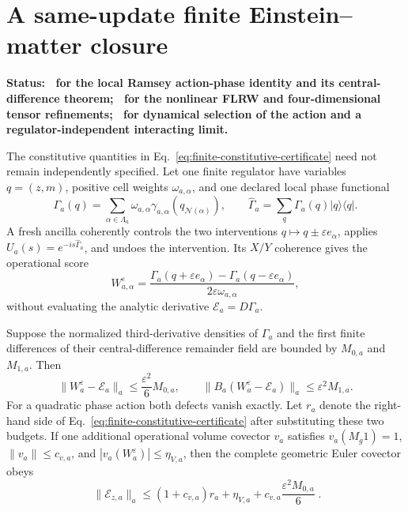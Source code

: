 \section{A same-update finite Einstein--matter closure}
\label{sec:same-update-einstein}

\textbf{Status: \StatusModel\ for the local Ramsey action-phase identity and
its central-difference theorem; \StatusNumerical\ for the nonlinear FLRW and
four-dimensional tensor refinements; \StatusOpen\ for dynamical selection of
the action and a regulator-independent interacting limit.}

The constitutive quantities in
Eq.~\eqref{eq:finite-constitutive-certificate} need not remain independently
specified.  Let one finite regulator have variables \(q=(z,m)\), positive
cell weights \(\omega_{a,\alpha}\), and one declared local phase functional
\begin{equation}
 \Gamma_a(q)=\sum_{\alpha\in\Lambda_a}
 \omega_{a,\alpha}\gamma_{a,\alpha}(q_{\mathcal N(\alpha)}),
 \qquad
 \widehat\Gamma_a=\sum_q\Gamma_a(q)|q\rangle\langle q|.
 \label{eq:same-update-local-action}
\end{equation}
A fresh ancilla coherently controls the two interventions
\(q\mapsto q\pm\varepsilon e_\alpha\), applies
\(U_a(s)=e^{-is\widehat\Gamma_a}\), and undoes the intervention.  Its
\(X/Y\) coherence gives the operational score
\begin{equation}
 W^\varepsilon_{a,\alpha}
 =\frac{\Gamma_a(q+\varepsilon e_\alpha)
              -\Gamma_a(q-\varepsilon e_\alpha)}
        {2\varepsilon\omega_{a,\alpha}} ,
 \label{eq:same-update-operational-score}
\end{equation}
without evaluating the analytic derivative
\(\mathcal E_a=D\Gamma_a\).

\begin{theorem}
\label{thm:same-update-einstein}
Suppose the normalized third-derivative densities of \(\Gamma_a\) and the
first finite differences of their central-difference remainder field are
bounded by \(M_{0,a}\) and \(M_{1,a}\).  Then
\begin{equation}
 \|W_a^\varepsilon-\mathcal E_a\|_a
 \le\frac{\varepsilon^2}{6}M_{0,a},
 \qquad
 \|B_a(W_a^\varepsilon-\mathcal E_a)\|_a
 \le\varepsilon^2M_{1,a}.
 \label{eq:same-update-two-defects}
\end{equation}
For a quadratic phase action both defects vanish exactly.  Let \(r_a\)
denote the right-hand side of
Eq.~\eqref{eq:finite-constitutive-certificate} after substituting these two
budgets.  If one additional operational volume covector \(v_a\) satisfies
\(v_a(M_g1)=1\), \(\|v_a\|\le c_{v,a}\), and
\(|v_a(W_a^\varepsilon)|\le\eta_{V,a}\), then the complete geometric Euler
covector obeys
\begin{equation}
 \boxed{\;
 \|\mathcal E_{z,a}\|_a
 \le (1+c_{v,a})r_a+\eta_{V,a}
       +c_{v,a}\frac{\varepsilon^2M_{0,a}}{6}\; .}
 \label{eq:same-update-full-certificate}
\end{equation}
\end{theorem}

